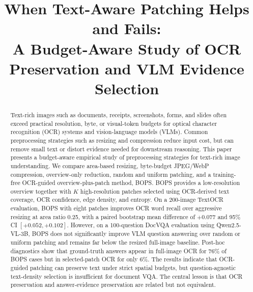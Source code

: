 \documentclass[conference]{IEEEtran}
\newcommand{\method}{BOPS}
\newcommand{\datasetocr}{TextOCR}
\newcommand{\datasetvlm}{DocVQA}
\begin{document}
\title{When Text-Aware Patching Helps and Fails:\\
A Budget-Aware Study of OCR Preservation and VLM Evidence Selection}

\author{
}

\maketitle

\begin{abstract}
Text-rich images such as documents, receipts, screenshots, forms, and slides often exceed practical resolution, byte, or visual-token budgets for optical character recognition (OCR) systems and vision-language models (VLMs). Common preprocessing strategies such as resizing and compression reduce input cost, but can remove small text or distort evidence needed for downstream reasoning. This paper presents a budget-aware empirical study of preprocessing strategies for text-rich image understanding. We compare area-based resizing, byte-budget JPEG/WebP compression, overview-only reduction, random and uniform patching, and a training-free OCR-guided overview-plus-patch method, \method. \method{} provides a low-resolution overview together with $K$ high-resolution patches selected using OCR-derived text coverage, OCR confidence, edge density, and entropy. On a 200-image \datasetocr{} evaluation, \method{} with eight patches improves OCR word recall over aggressive resizing at area ratio 0.25, with a paired bootstrap mean difference of $+0.077$ and 95\% CI $[+0.052,+0.102]$. However, on a 100-question \datasetvlm{} evaluation using Qwen2.5-VL-3B, \method{} does not significantly improve VLM question answering over random or uniform patching and remains far below the resized full-image baseline. Post-hoc diagnostics show that ground-truth answers appear in full-image OCR for 76\% of \method{} cases but in selected-patch OCR for only 6\%. The results indicate that OCR-guided patching can preserve text under strict spatial budgets, but question-agnostic text-density selection is insufficient for document VQA. The central lesson is that OCR preservation and answer-evidence preservation are related but not equivalent.
\end{abstract}
\end{document}
